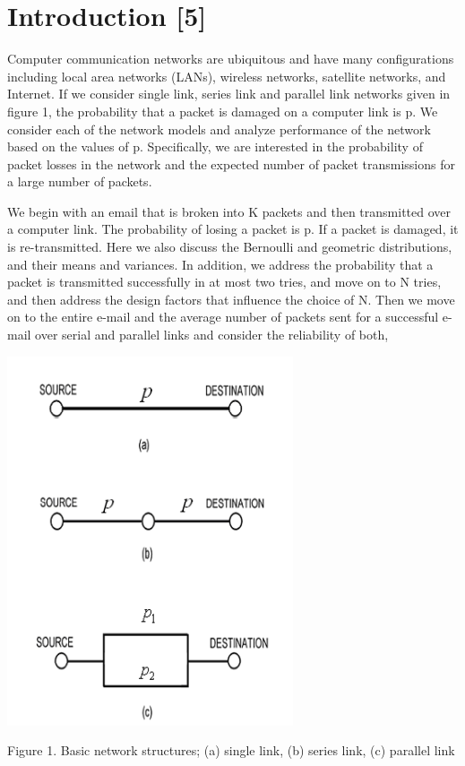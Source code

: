 \documentclass[10pt,twocolumn,letterpaper]{article}
\begin{document}
\section{Introduction [5]}

Computer communication networks are ubiquitous and have many configurations including local 
area networks (LANs), wireless networks, satellite networks, and Internet. If we consider single link, series link and parallel link networks given in figure 1, the probability that a packet is damaged on a computer link is p. We consider each of the network models and analyze performance of the network based on the values of p. Specifically, we are interested in the probability of packet losses in the network and the expected number of packet transmissions for a large number of packets. 

We begin with an email that is broken into K packets and then transmitted over a computer link. The probability of losing a packet is p. If a packet is damaged, it is re-transmitted. Here we also discuss the Bernoulli and geometric distributions, and their means and variances. In addition, we address the probability that a packet is transmitted successfully in at most two tries, and move on to N tries, and then address the design factors that influence the choice of N. Then we move on to the entire e-mail and the average number of packets sent for a successful e-mail over serial and parallel links and consider the reliability of both, 

\includegraphics[width=\linewidth]{plots/fig1.PNG}
\caption{Figure 1. Basic network structures; (a) single link, (b) series link, (c) parallel link}
\end{document}
